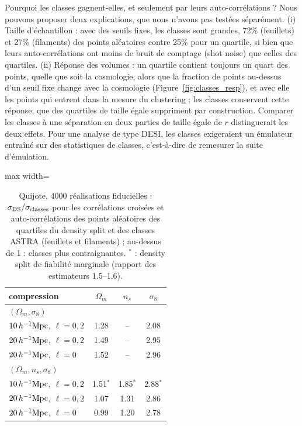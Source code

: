 Pourquoi les classes gagnent-elles, et seulement par leurs auto-corrélations ? Nous pouvons proposer deux explications, que nous n'avons pas testées séparément. (i) Taille d'échantillon : avec des seuils fixes, les classes sont grandes, 72\% (feuillets) et 27\% (filaments) des points aléatoires contre 25\% pour un quartile, si bien que leurs auto-corrélations ont moins de bruit de comptage (shot noise) que celles des quartiles. (ii) Réponse des volumes : un quartile contient toujours un quart des points, quelle que soit la cosmologie, alors que la fraction de points au-dessus d'un seuil fixe change avec la cosmologie (Figure~\ref{fig:classes_resp}), et avec elle les points qui entrent dans la mesure du clustering ; les classes conservent cette réponse, que des quartiles de taille égale suppriment par construction. Comparer les classes à une séparation en deux parties de taille égale de $r$ distinguerait les deux effets. Pour une analyse de type DESI, les classes exigeraient un émulateur entraîné sur des statistiques de classes, c'est-à-dire de remesurer la suite d'émulation.

\begin{table}[!htbp]
\centering\small
\begin{adjustbox}{max width=\linewidth}
\begin{tabular}{lccc}
\toprule
compression & $\Omega_m$ & $n_s$ & $\sigma_8$ \\
\midrule
\multicolumn{4}{l}{$(\Omega_m,\sigma_8)$} \\
$10\,h^{-1}\mathrm{Mpc}$, $\ell=0,2$ & 1.28 & -- & 2.08 \\
$20\,h^{-1}\mathrm{Mpc}$, $\ell=0,2$ & 1.49 & -- & 2.95 \\
$20\,h^{-1}\mathrm{Mpc}$, $\ell=0$ & 1.52 & -- & 2.96 \\
\multicolumn{4}{l}{$(\Omega_m,n_s,\sigma_8)$} \\
$10\,h^{-1}\mathrm{Mpc}$, $\ell=0,2$ & 1.51$^*$ & 1.85$^*$ & 2.88$^*$ \\
$20\,h^{-1}\mathrm{Mpc}$, $\ell=0,2$ & 1.07 & 1.31 & 2.86 \\
$20\,h^{-1}\mathrm{Mpc}$, $\ell=0$ & 0.99 & 1.20 & 2.78 \\
\bottomrule
\end{tabular}
\end{adjustbox}
\caption{Quijote, 4000 réalisations fiducielles : $\sigma_{\rm DS}/\sigma_{\rm classes}$ pour les corrélations croisées et auto-corrélations des points aléatoires des quartiles du density split et des classes ASTRA (feuillets et filaments) ; au-dessus de 1 : classes plus contraignantes. $^*$ : density split de fiabilité marginale (rapport des estimateurs 1.5--1.6).}
\label{tab:classes}
\end{table}


